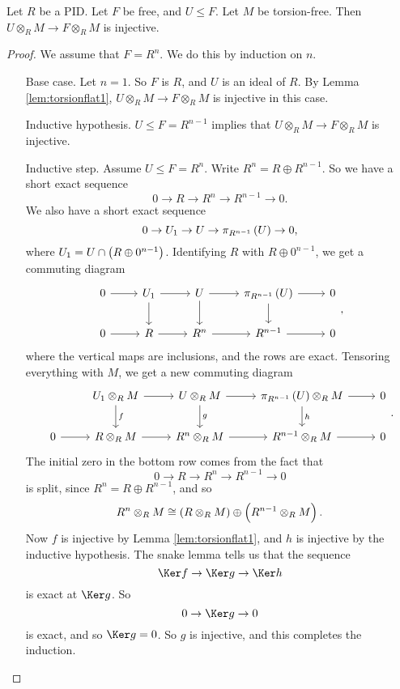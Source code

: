 \begin{lemma}
\label{lem:torsionflat4}
Let $ R $ be a PID. Let $ F $ be free, and $ U \le F $. Let $ M $ be torsion-free. Then $ U \otimes_R M \to F \otimes_R M $ is injective.
\end{lemma}

\begin{proof}
We assume that $ F = R^n $. We do this by induction on $ n $.
\begin{itemize}[leftmargin=1.5in]
\item[Base case.] Let $ n = 1 $. So $ F $ is $ R $, and $ U $ is an ideal of $ R $. By Lemma \ref{lem:torsionflat1}, $ U \otimes_R M \to F \otimes_R M $ is injective in this case.
\item[Inductive hypothesis.] $ U \le F = R^{n - 1} $ implies that $ U \otimes_R M \to F \otimes_R M $ is injective.
\item[Inductive step.] Assume $ U \le F = R^n $. Write $ R^n = R \oplus R^{n - 1} $. So we have a short exact sequence
$$ 0 \to R \to R^n \to R^{n - 1} \to 0. $$
We also have a short exact sequence
$$ 0 \to U_1 \to U \to \pi_{R^{n - 1}}\br{U} \to 0, $$
where $ U_1 = U \cap \br{R \oplus 0^{n - 1}} $. Identifying $ R $ with $ R \oplus 0^{n - 1} $, we get a commuting diagram
$$
\begin{tikzcd}
0 \arrow{r} & U_1 \arrow{r} \arrow{d} & U \arrow{r} \arrow{d} & \pi_{R^{n - 1}}\br{U} \arrow{r} \arrow{d} & 0 \\
0 \arrow{r} & R \arrow{r} & R^n \arrow{r} & R^{n - 1} \arrow{r} & 0
\end{tikzcd},
$$
where the vertical maps are inclusions, and the rows are exact. Tensoring everything with $ M $, we get a new commuting diagram
$$
\begin{tikzcd}
& U_1 \otimes_R M \arrow{r} \arrow{d}{f} & U \otimes_R M \arrow{r} \arrow{d}{g} & \pi_{R^{n - 1}}\br{U} \otimes_R M \arrow{r} \arrow{d}{h} & 0 \\
0 \arrow{r} & R \otimes_R M \arrow{r} & R^n \otimes_R M \arrow{r} & R^{n - 1} \otimes_R M \arrow{r} & 0
\end{tikzcd}.
$$
The initial zero in the bottom row comes from the fact that
$$ 0 \to R \to R^n \to R^{n - 1} \to 0 $$
is split, since $ R^n = R \oplus R^{n - 1} $, and so
$$ R^n \otimes_R M \cong \br{R \otimes_R M} \oplus \br{R^{n - 1} \otimes_R M}. $$
Now $ f $ is injective by Lemma \ref{lem:torsionflat1}, and $ h $ is injective by the inductive hypothesis. The snake lemma tells us that the sequence
$$ \Ker f \to \Ker g \to \Ker h $$
is exact at $ \Ker g $. So
$$ 0 \to \Ker g \to 0 $$
is exact, and so $ \Ker g = 0 $. So $ g $ is injective, and this completes the induction.
\end{itemize}
\end{proof}

